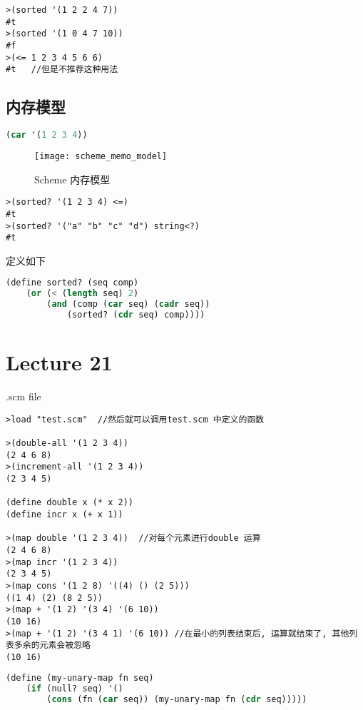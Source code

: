 \documentclass{article}
\begin{document}
\begin{verbatim}
>(sorted '(1 2 2 4 7))
#t
>(sorted '(1 0 4 7 10))
#f
>(<= 1 2 3 4 5 6 6)
#t   //但是不推荐这种用法
\end{verbatim}

\subsection{内存模型}
\begin{lstlisting}[language = Lisp]
(car '(1 2 3 4))
\end{lstlisting}
\begin{figure}[htbp]
	\centering
	\texttt{[image: scheme\_memo\_model]}\\
	\caption{Scheme 内存模型}\label{fig.scheme.memo.model}
\end{figure}


\begin{verbatim}
>(sorted? '(1 2 3 4) <=)
#t
>(sorted? '("a" "b" "c" "d") string<?)
#t
\end{verbatim}
定义如下
\begin{lstlisting}[language = Lisp]
(define sorted? (seq comp)
	(or (< (length seq) 2)
		(and (comp (car seq) (cadr seq))
			(sorted? (cdr seq) comp))))
\end{lstlisting}

\section{Lecture 21}
.scm file
\begin{verbatim}
>load "test.scm"  //然后就可以调用test.scm 中定义的函数

>(double-all '(1 2 3 4))
(2 4 6 8)
>(increment-all '(1 2 3 4))
(2 3 4 5)

(define double x (* x 2))
(define incr x (+ x 1))

>(map double '(1 2 3 4))  //对每个元素进行double 运算
(2 4 6 8)
>(map incr '(1 2 3 4))
(2 3 4 5)
>(map cons '(1 2 8) '((4) () (2 5)))
((1 4) (2) (8 2 5))
>(map + '(1 2) '(3 4) '(6 10))
(10 16)
>(map + '(1 2) '(3 4 1) '(6 10)) //在最小的列表结束后, 运算就结束了, 其他列表多余的元素会被忽略
(10 16)
\end{verbatim}

\begin{lstlisting}[language = Lisp]
(define (my-unary-map fn seq)
	(if (null? seq) '()
		(cons (fn (car seq)) (my-unary-map fn (cdr seq)))))
\end{lstlisting}
\end{document}
